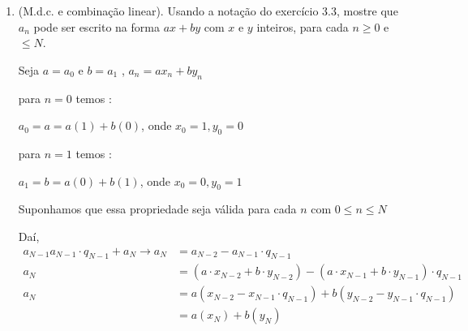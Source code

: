 \begin{enumerate}[label=3.\arabic*.]
\begin{enumerate}[label=\Roman*.]
        \item $a_N = mdc(a,b)$
    
        Quando o resto é $0$ temos o seguinte : 

        $a_{N-1} = a_N \cdot q_N \rightarrow a_{N-1} \mid a_N $

        $a_{N-2} = a_{N-1} \cdot q_{N-1} + a_N$, como $a_N$ divide ambos os termos ele também divide $a_{N-2}$

        Aplicando o mesmo processo cheagamos que $a_N \mid a$ e $a_N \mid b$

        Além disso, seja $d$ um divisor comum qualquer de $a$ e $b$, temos que : 

        $a_0 = a_1 q_1 + a_2 \Leftrightarrow a_2 = a_0 - a_1 q_1$, como $d \mid a_0$ e $d \mid a_1q_1$,logo 
        $d$ divide a diferença entre eles.

        Descendo por todas as equações chegamos que $d$ divide todos os restos $a_2,a_3,\ldots,a_n$

        Se todo divisor comum de $a$ e $b$ também divide $a_n$, então $a_n \ge$ que qualquer outro divisor comum

        Portanto $mdc(a,b) = a_n$

    \end{enumerate}

    \item (M.d.c. e combinação linear). Usando a notação do exercício 3.3, mostre que $a_n$ 
    pode ser escrito na forma $ax + by$ com $x$ e $y$ inteiros, para cada $n \geq 0$ e $\leq N$.
    
    Seja $a = a_0$ e $b = a_1$ , $a_n = ax_n + by_n$ 
    
    para $n = 0$ temos :
    
    $a_0 = a = a(1) + b(0)$, onde $x_0 = 1, y_0 = 0$

    para $n = 1$ temos :
    
    $a_1 = b = a(0) + b(1)$, onde $x_0 = 0, y_0 = 1$

    Suponhamos que essa propriedade seja válida para cada $n$ com $0 \leq n \leq N$

    Daí,
    \begin{align*}
        a_{N-1} a_{N-1} \cdot q_{N-1} + a_N \rightarrow a_{N} &= a_{N-2} - a_{N-1} \cdot q_{N-1}\\
        a_N &= (a \cdot x_{N-2} + b \cdot y_{N-2}) - (a \cdot x_{N-1} + b \cdot y_{N-1}) \cdot q_{N-1} \\
        a_N &= a(x_{N-2} - x_{N-1} \cdot q_{N-1}) + b(y_{N-2} - y_{N-1} \cdot q_{N-1}) \\
        &= a(x_N) + b(y_N)
    \end{align*}


\end{enumerate}
